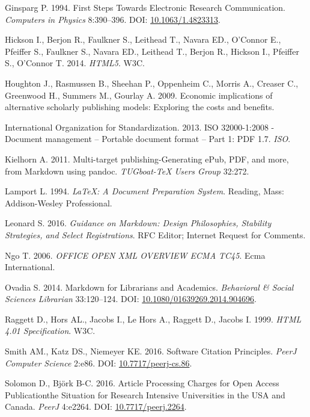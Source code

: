 \documentclass[10pt,fleqn]{wlpeerj}
\begin{document}
\hypertarget{ref-ginsparg_first_1994}{}
Ginsparg
P.
1994.
First
Steps
Towards
Electronic
Research
Communication.
\emph{Computers
in
Physics}
8:390--396.
DOI:
\href{https://doi.org/10.1063/1.4823313}{10.1063/1.4823313}.

\hypertarget{ref-HTML5}{}
Hickson
I.,
Berjon
R.,
Faulkner
S.,
Leithead
T.,
Navara
ED.,
O'Connor
E.,
Pfeiffer
S.,
Faulkner
S.,
Navara
ED.,
Leithead
T.,
Berjon
R.,
Hickson
I.,
Pfeiffer
S.,
O'Connor
T.
2014.
\emph{HTML5}.
W3C.

\hypertarget{ref-houghton_economic_2009}{}
Houghton
J.,
Rasmussen
B.,
Sheehan
P.,
Oppenheim
C.,
Morris
A.,
Creaser
C.,
Greenwood
H.,
Summers
M.,
Gourlay
A.
2009.
Economic
implications
of
alternative
scholarly
publishing
models:
Exploring
the
costs
and
benefits.

\hypertarget{ref-international_organization_for_standardization_iso_2013}{}
International
Organization
for
Standardization.
2013.
ISO
32000-1:2008
-
Document
management
--
Portable
document
format
--
Part
1:
PDF
1.7.
\emph{ISO}.

\hypertarget{ref-kielhorn_multi_2011}{}
Kielhorn
A.
2011.
Multi-target
publishing-Generating
ePub,
PDF,
and
more,
from
Markdown
using
pandoc.
\emph{TUGboat-TeX
Users
Group}
32:272.

\hypertarget{ref-lamport_latex:_1994}{}
Lamport
L.
1994.
\emph{LaTeX:
A
Document
Preparation
System}.
Reading,
Mass:
Addison-Wesley
Professional.

\hypertarget{ref-rfc7764}{}
Leonard
S.
2016.
\emph{Guidance
on
Markdown:
Design
Philosophies,
Stability
Strategies,
and
Select
Registrations}.
RFC
Editor;
Internet
Request
for
Comments.

\hypertarget{ref-OOXML}{}
Ngo
T.
2006.
\emph{OFFICE
OPEN
XML
OVERVIEW
ECMA
TC45}.
Ecma
International.

\hypertarget{ref-ovadia_markdown_2014}{}
Ovadia
S.
2014.
Markdown
for
Librarians
and
Academics.
\emph{Behavioral
\&
Social
Sciences
Librarian}
33:120--124.
DOI:
\href{https://doi.org/10.1080/01639269.2014.904696}{10.1080/01639269.2014.904696}.

\hypertarget{ref-HTML4}{}
Raggett
D.,
Hors
AL.,
Jacobs
I.,
Le
Hors
A.,
Raggett
D.,
Jacobs
I.
1999.
\emph{HTML
4.01
Specification}.
W3C.

\hypertarget{ref-smith_software_2016}{}
Smith
AM.,
Katz
DS.,
Niemeyer
KE.
2016.
Software
Citation
Principles.
\emph{PeerJ
Computer
Science}
2:e86.
DOI:
\href{https://doi.org/10.7717/peerj-cs.86}{10.7717/peerj-cs.86}.

\hypertarget{ref-solomon_article_2016}{}
Solomon
D.,
Björk
B-C.
2016.
Article
Processing
Charges
for
Open
Access
Publicationthe
Situation
for
Research
Intensive
Universities
in
the
USA
and
Canada.
\emph{PeerJ}
4:e2264.
DOI:
\href{https://doi.org/10.7717/peerj.2264}{10.7717/peerj.2264}.
\end{document}
